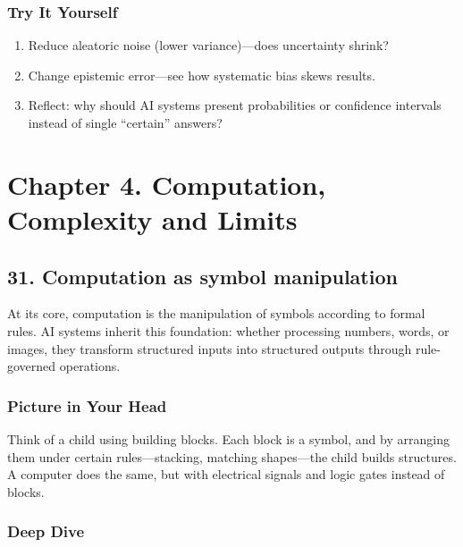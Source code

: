 \documentclass[
  letterpaper,
  DIV=11,
  numbers=noendperiod]{scrreprt}
\providecommand{\tightlist}{%
  \setlength{\itemsep}{0pt}\setlength{\parskip}{0pt}}
\begin{document}
\subsubsection{Try It Yourself}\label{try-it-yourself-29}

\begin{enumerate}
\def\labelenumi{\arabic{enumi}.}
\tightlist
\item
  Reduce aleatoric noise (lower variance)---does uncertainty shrink?
\item
  Change epistemic error---see how systematic bias skews results.
\item
  Reflect: why should AI systems present probabilities or confidence
  intervals instead of single ``certain'' answers?
\end{enumerate}

\section{Chapter 4. Computation, Complexity and
Limits}\label{chapter-4.-computation-complexity-and-limits}

\subsection{31. Computation as symbol
manipulation}\label{computation-as-symbol-manipulation}

At its core, computation is the manipulation of symbols according to
formal rules. AI systems inherit this foundation: whether processing
numbers, words, or images, they transform structured inputs into
structured outputs through rule-governed operations.

\subsubsection{Picture in Your Head}\label{picture-in-your-head-30}

Think of a child using building blocks. Each block is a symbol, and by
arranging them under certain rules---stacking, matching shapes---the
child builds structures. A computer does the same, but with electrical
signals and logic gates instead of blocks.

\subsubsection{Deep Dive}\label{deep-dive-30}
\end{document}
